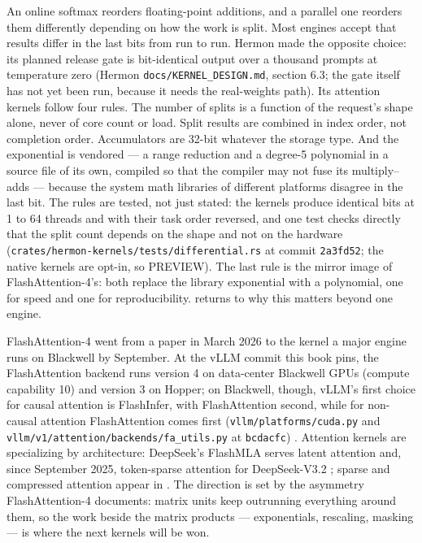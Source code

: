 
An online softmax reorders floating-point additions, and a parallel one
reorders them differently depending on how the work is split. Most engines
accept that results differ in the last bits from run to run. Hermon made the
opposite choice: its planned release gate is bit-identical output over a
thousand prompts at temperature zero (Hermon \texttt{docs/KERNEL\_DESIGN.md},
section 6.3; the gate itself has not yet been run, because it needs the
real-weights path). Its attention kernels follow four rules. The number of
splits is a function of the request's shape alone, never of core count or
load. Split results are combined in index order, not completion order.
Accumulators are 32-bit whatever the storage type. And the exponential is
vendored --- a range reduction and a degree-5 polynomial in a source file of
its own, compiled so that the compiler may not fuse its multiply--adds ---
because the system math libraries of different platforms disagree in the last
bit. The rules are tested, not just stated: the kernels produce identical bits
at 1 to 64 threads and with their task order reversed, and one test checks
directly that the split count depends on the shape and not on the hardware
(\texttt{crates/hermon-kernels/tests/differential.rs} at commit
\texttt{2a3fd52}; the native kernels are opt-in, so PREVIEW). The last rule is
the mirror image of FlashAttention-4's: both replace the library exponential
with a polynomial, one for speed and one for reproducibility.  returns to why this matters beyond
one engine.


FlashAttention-4 went from a paper in March 2026 to the kernel a major engine
runs on Blackwell by September. At the vLLM commit this book pins, the
FlashAttention backend runs version 4 on data-center Blackwell GPUs (compute
capability 10) and version 3 on Hopper; on Blackwell, though, vLLM's first
choice for causal attention is FlashInfer, with FlashAttention second, while
for non-causal attention FlashAttention comes first
(\texttt{vllm/platforms/cuda.py} and
\texttt{vllm/v1/attention/backends/fa\_utils.py} at \texttt{bcdacfc})
\cite{vllm2026attentionbackends}. Attention kernels are specializing by
architecture: DeepSeek's FlashMLA serves latent attention and, since September
2025, token-sparse attention for DeepSeek-V3.2 \cite{deepseek2025flashmla};
sparse and compressed attention appear in . The direction
is set by the asymmetry FlashAttention-4 documents: matrix units keep outrunning
everything around them, so the work beside the matrix products ---
exponentials, rescaling, masking --- is where the next kernels will be won.

